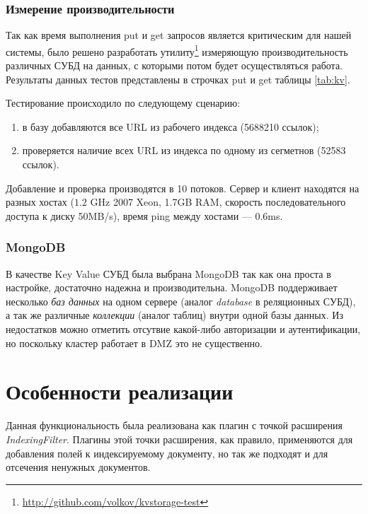 \subsubsection{Измерение производительности}
Так как время выполнения put и get запросов является критическим для нашей системы, было решено разработать утилиту\footnote{\href{http://github.com/volkov/kvstorage-test}{http://github.com/volkov/kvstorage-test}} измеряющую производительность различных СУБД на данных, с которыми потом будет осуществляться работа. Результаты данных тестов представлены в строчках put и get таблицы \ref{tab:kv}.

Тестирование происходило по следующему сценарию:
\begin{enumerate}
 \item в базу добавляются все URL из рабочего индекса (5688210 ссылок);
 \item проверяется наличие всех URL из индекса по одному из сегметнов (52583 ссылок).
\end{enumerate}
Добавление и проверка производятся в 10 потоков. Сервер и клиент находятся на разных хостах ($1.2$ GHz 2007 Xeon, 1.7GB RAM, скорость последовательного доступа к диску 50MB/s), время ping между хостами --- 0.6ms.
\subsubsection{MongoDB}
В качестве Key Value СУБД была выбрана MongoDB так как она проста в настройке, достаточно надежна и производительна. MongoDB поддерживает несколько \textit{баз данных} на одном сервере (аналог \textit{database} в реляционных СУБД), а так же различные \textit{коллекции} (аналог таблиц) внутри одной базы данных. Из недостатков можно отметить отсутвие какой-либо авторизации и аутентификации, но поскольку кластер работает в DMZ это не существенно.                                                                                                                                                                                                                                                                                        
\section{Особенности реализации}
Данная функциональность была реализована как плагин с точкой расширения \textit{IndexingFilter}. Плагины этой точки расширения, как правило, применяются для добавления полей к индексируемому документу, но так же подходят и для отсечения ненужных документов.

